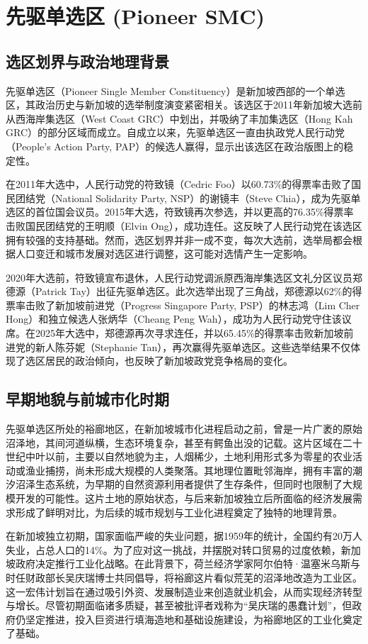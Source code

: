 \documentclass[11pt,a4paper,twoside,openany]{book}
\begin{document}
\chapter{先驱单选区 (Pioneer SMC)}

\section{选区划界与政治地理背景}
先驱单选区（Pioneer Single Member Constituency）是新加坡西部的一个单选区，其政治历史与新加坡的选举制度演变紧密相关。该选区于2011年新加坡大选前从西海岸集选区（West Coast GRC）中划出，并吸纳了丰加集选区（Hong Kah GRC）的部分区域而成立。自成立以来，先驱单选区一直由执政党人民行动党（People's Action Party, PAP）的候选人赢得，显示出该选区在政治版图上的稳定性。

在2011年大选中，人民行动党的符致镜（Cedric Foo）以60.73\%的得票率击败了国民团结党（National Solidarity Party, NSP）的谢镜丰（Steve Chia），成为先驱单选区的首位国会议员。2015年大选，符致镜再次参选，并以更高的76.35\%得票率击败国民团结党的王明顺（Elvin Ong），成功连任。这反映了人民行动党在该选区拥有较强的支持基础。然而，选区划界并非一成不变，每次大选前，选举局都会根据人口变迁和城市发展对选区进行调整，这可能对选情产生一定影响。

2020年大选前，符致镜宣布退休，人民行动党调派原西海岸集选区文礼分区议员郑德源（Patrick Tay）出征先驱单选区。此次选举出现了三角战，郑德源以62\%的得票率击败了新加坡前进党（Progress Singapore Party, PSP）的林志鸿（Lim Cher Hong）和独立候选人张炳华（Cheang Peng Wah），成功为人民行动党守住该议席。在2025年大选中，郑德源再次寻求连任，并以65.45\%的得票率击败新加坡前进党的新人陈芬妮（Stephanie Tan），再次赢得先驱单选区。这些选举结果不仅体现了选区居民的政治倾向，也反映了新加坡政党竞争格局的变化。

\section{早期地貌与前城市化时期}
先驱单选区所处的裕廊地区，在新加坡城市化进程启动之前，曾是一片广袤的原始沼泽地，其间河道纵横，生态环境复杂，甚至有鳄鱼出没的记载。这片区域在二十世纪中叶以前，主要以自然地貌为主，人烟稀少，土地利用形式多为零星的农业活动或渔业捕捞，尚未形成大规模的人类聚落。其地理位置毗邻海岸，拥有丰富的潮汐沼泽生态系统，为早期的自然资源利用者提供了生存条件，但同时也限制了大规模开发的可能性。这片土地的原始状态，与后来新加坡独立后所面临的经济发展需求形成了鲜明对比，为后续的城市规划与工业化进程奠定了独特的地理背景。

在新加坡独立初期，国家面临严峻的失业问题，据1959年的统计，全国约有20万人失业，占总人口的14\%。为了应对这一挑战，并摆脱对转口贸易的过度依赖，新加坡政府决定推行工业化战略。在此背景下，荷兰经济学家阿尔伯特·温塞米乌斯与时任财政部长吴庆瑞博士共同倡导，将裕廊这片看似荒芜的沼泽地改造为工业区。这一宏伟计划旨在通过吸引外资、发展制造业来创造就业机会，从而实现经济转型与增长。尽管初期面临诸多质疑，甚至被批评者戏称为“吴庆瑞的愚蠢计划”，但政府仍坚定推进，投入巨资进行填海造地和基础设施建设，为裕廊地区的工业化奠定了基础。
\end{document}
